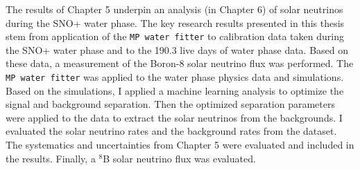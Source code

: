 The results of Chapter 5 underpin an analysis (in Chapter 6) of solar neutrinos during the SNO+ water phase. The key research results presented in this thesis stem from application of the \texttt{MP water fitter} to calibration data taken during the SNO+ water phase and to the 190.3 live days of water phase data. Based on these data, a measurement of the Boron-8 solar neutrino flux was performed. The \texttt{MP water fitter} was applied to the water phase physics data and simulations. Based on the simulations, I applied a machine learning analysis to optimize the signal and background separation. Then the optimized separation parameters were applied to the data to extract the solar neutrinos from the backgrounds. I evaluated the solar neutrino rates and the background rates from the dataset. The systematics and uncertainties from Chapter 5 were evaluated and included in the results. Finally, a $^8$B solar neutrino flux was evaluated.